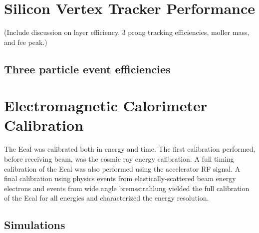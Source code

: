 \documentclass[12pt]{report}
\begin{document}
\section{Silicon Vertex Tracker Performance}

(Include discussion on layer efficiency, 3 prong tracking efficiencies, moller mass, and fee peak.)

\subsection{Three particle event efficiencies}

\section{Electromagnetic Calorimeter Calibration}

The Ecal was calibrated both in energy and time. The first calibration performed, before receiving beam, was the cosmic ray energy calibration. A full timing calibration of the Ecal was also performed using the accelerator RF signal. A final calibration using physics events from elastically-scattered beam energy electrons and events from wide angle bremsstrahlung yielded the full calibration of the Ecal for all energies and characterized the energy resolution. 



\subsection{Simulations}
\end{document}
